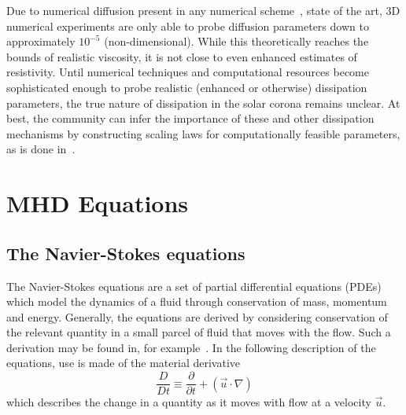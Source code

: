 Due to numerical diffusion present in any numerical scheme~\cite{ferzigerComputationalMethodsFluid2002}, state of the art, 3D numerical experiments are only able to probe diffusion parameters down to approximately $10^{-5}$ (non-dimensional). While this theoretically reaches the bounds of realistic viscosity, it is not close to even enhanced estimates of resistivity. Until numerical techniques and computational resources become sophisticated enough to probe realistic (enhanced or otherwise) dissipation parameters, the true nature of dissipation in the solar corona remains unclear. At best, the community can infer the importance of these and other dissipation mechanisms by constructing scaling laws for computationally feasible parameters, as is done in~\cite{craigViscousDissipation3D2013}.

\section{MHD Equations}

\subsection{The Navier-Stokes equations}

The Navier-Stokes equations are a set of partial differential equations (PDEs) which model the dynamics of a fluid through conservation of mass, momentum and energy. Generally, the equations are derived by considering conservation of the relevant quantity in a small parcel of fluid that moves with the flow. Such a derivation may be found in, for example~\cite{andersonComputationalFluidDynamics1995}. In the following description of the equations, use is made of the material derivative
\begin{equation}
  \label{eq:material_derivative}
  \frac{D}{Dt} \equiv \frac{\partial}{\partial t} + (\vec{u} \cdot \nabla)
\end{equation}
which describes the change in a quantity as it moves with flow at a velocity $\vec{u}$.

